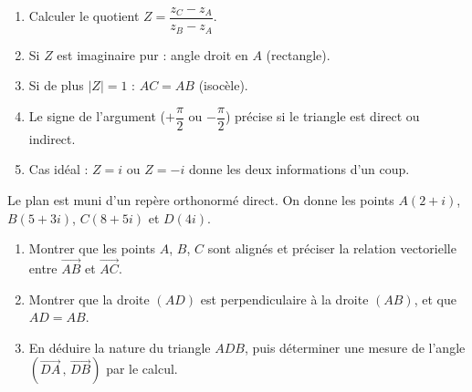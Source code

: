 \documentclass[11pt]{article}
\begin{document}
\begin{methode}
\begin{enumerate}
\item Calculer le quotient $Z = \dfrac{z_C - z_A}{z_B - z_A}$.
\item Si $Z$ est imaginaire pur : angle droit en $A$ (rectangle).
\item Si de plus $|Z| = 1$ : $AC = AB$ (isocèle).
\item Le signe de l'argument ($+\dfrac{\pi}{2}$ ou $-\dfrac{\pi}{2}$) précise si le triangle est direct ou indirect.
\item Cas idéal : $Z = i$ ou $Z = -i$ donne les deux informations d'un coup.
\end{enumerate}
\end{methode}

\begin{exercice}
Le plan est muni d'un repère orthonormé direct. On donne les points $A(2 + i)$, $B(5 + 3i)$, $C(8 + 5i)$ et $D(4i)$.
\begin{enumerate}
\item Montrer que les points $A$, $B$, $C$ sont alignés et préciser la relation vectorielle entre $\overrightarrow{AB}$ et $\overrightarrow{AC}$.
\item Montrer que la droite $(AD)$ est perpendiculaire à la droite $(AB)$, et que $AD = AB$.
\item En déduire la nature du triangle $ADB$, puis déterminer une mesure de l'angle $\left(\overrightarrow{DA}\,,\,\overrightarrow{DB}\right)$ par le calcul.
\end{enumerate}
\end{exercice}
\end{document}
